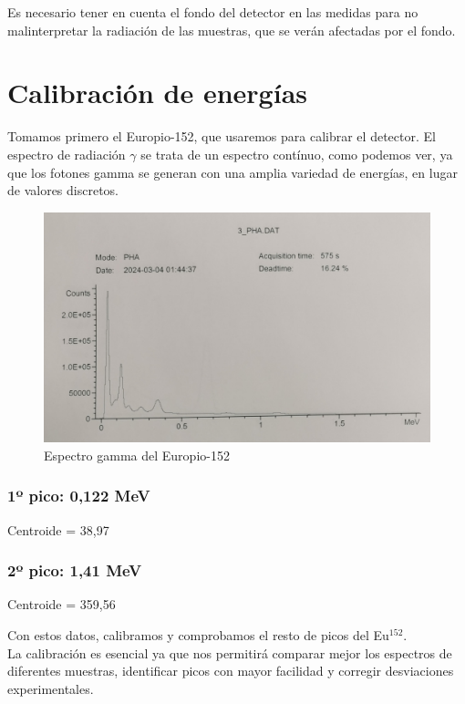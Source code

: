 \documentclass[a4paper,12pt,spanish]{article}
\begin{document}
 Es necesario tener en cuenta el fondo del detector en las medidas para no malinterpretar la radiación de las muestras, que se verán afectadas por el fondo. 
 
 
	
	\section{Calibración de energías}
	
	
	
	Tomamos primero el Europio-152, que usaremos para calibrar el detector. El espectro de radiación $\gamma$ se trata de un espectro contínuo, como podemos ver, ya que los fotones gamma se generan con una amplia variedad de energías, en lugar de valores discretos.
	
	
	
\begin{figure}[H]
	\centering
	\includegraphics[width=0.7\linewidth]{../graficas_procesadas/PHA_3}
	\caption{Espectro gamma del Europio-152}
	\label{fig:pha3}
\end{figure}
	
	\subsubsection*{1º pico: 0,122 MeV}
	Centroide = 38,97
	
	\subsubsection*{2º pico: 1,41 MeV}
	Centroide = 359,56
	
	\vspace{\baselineskip}
	
	Con estos datos, calibramos y comprobamos el resto de picos del Eu$^{152}$. \\
	
	La calibración es esencial ya que nos permitirá comparar mejor los espectros de diferentes muestras, identificar picos con mayor facilidad y corregir desviaciones experimentales.
	
\end{document}
